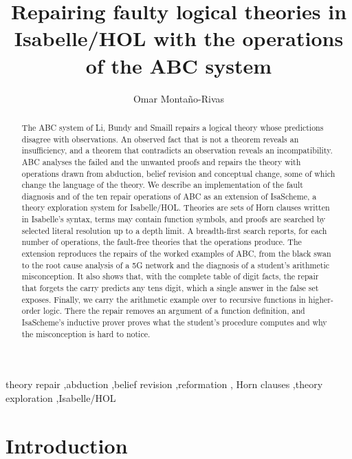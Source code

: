 \documentclass[preprint,12pt]{elsarticle}
\begin{document}
\begin{frontmatter}

\title{Repairing faulty logical theories in Isabelle/HOL with the operations
of the ABC system}

\author[aff]{Omar Monta\~{n}o-Rivas}
\address[aff]{Affiliation to be completed}

\begin{abstract}
The ABC system of Li, Bundy and Smaill repairs a logical theory whose
predictions disagree with observations. An observed fact that is not a
theorem reveals an insufficiency, and a theorem that contradicts an
observation reveals an incompatibility. ABC analyses the failed and the
unwanted proofs and repairs the theory with operations drawn from
abduction, belief revision and conceptual change, some of which change the
language of the theory. We describe an implementation of the fault
diagnosis and of the ten repair operations of ABC as an extension of
IsaScheme, a theory exploration system for Isabelle/HOL. Theories are sets
of Horn clauses written in Isabelle's syntax, terms may contain function
symbols, and proofs are searched by selected literal resolution up to a
depth limit. A breadth-first search reports, for each number of
operations, the fault-free theories that the operations produce. The
extension reproduces the repairs of the worked examples of ABC, from the
black swan to the root cause analysis of a 5G network and the diagnosis of
a student's arithmetic misconception. It also shows that, with the complete
table of digit facts, the repair that forgets the carry predicts any tens
digit, which a single answer in the false set exposes. Finally, we carry the
arithmetic example over to recursive functions in higher-order logic. There
the repair removes an argument of a function definition, and IsaScheme's
inductive prover proves what the student's procedure computes and why the
misconception is hard to notice.
\end{abstract}

\begin{keyword}
theory repair \sep abduction \sep belief revision \sep reformation \sep
Horn clauses \sep theory exploration \sep Isabelle/HOL
\end{keyword}

\end{frontmatter}

\section{Introduction}
\label{sec:intro}
\end{document}
